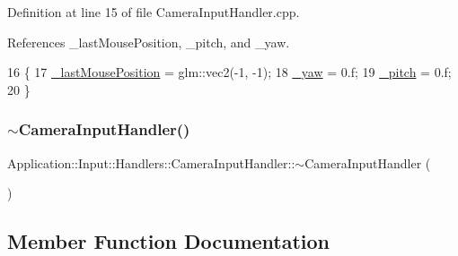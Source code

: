 Definition at line 15 of file Camera\+Input\+Handler.\+cpp.



References \+\_\+last\+Mouse\+Position, \+\_\+pitch, and \+\_\+yaw.


\begin{DoxyCode}
16 \{
17     \mbox{\hyperlink{classApplication_1_1Input_1_1Handlers_1_1CameraInputHandler_ae8e329dd433afb42e5f53b5937a927fb}{\_lastMousePosition}} = glm::vec2(-1, -1);
18     \mbox{\hyperlink{classApplication_1_1Input_1_1Handlers_1_1CameraInputHandler_a2fa09dcae6ed67d452d374a9fb629349}{\_yaw}} = 0.f;
19     \mbox{\hyperlink{classApplication_1_1Input_1_1Handlers_1_1CameraInputHandler_a0157ef737743b53e5db833012cd27372}{\_pitch}} = 0.f;
20 \}
\end{DoxyCode}
\mbox{\label{classApplication_1_1Input_1_1Handlers_1_1CameraInputHandler_a08ccb4be5e9da5e461b3b1905a8da90d}} 
\subsubsection{\texorpdfstring{$\sim$\+Camera\+Input\+Handler()}{~CameraInputHandler()}}
{\footnotesize\ttfamily Application\+::\+Input\+::\+Handlers\+::\+Camera\+Input\+Handler\+::$\sim$\+Camera\+Input\+Handler (\begin{DoxyParamCaption}{ }\end{DoxyParamCaption})\hspace{0.3cm}{\ttfamily [default]}}



\subsection{Member Function Documentation}
\mbox{\label{classApplication_1_1Input_1_1Handlers_1_1CameraInputHandler_a149884ea2dc9deea39d3dcd10dfa74b1}} 

